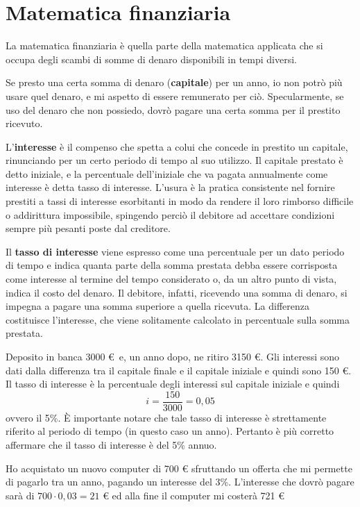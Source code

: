 
\chapter{Matematica finanziaria}

La matematica finanziaria è quella parte della matematica applicata che si 
occupa degli scambi di somme di denaro disponibili in tempi diversi.

Se presto una certa somma di denaro (\textbf{capitale}) per un anno, io non 
potrò più usare quel denaro, e mi aspetto di essere remunerato per ciò. 
Specularmente, se uso del denaro che non possiedo, dovrò pagare una certa somma 
per il prestito ricevuto. 

L'\textbf{interesse} è il compenso che spetta a colui che concede in prestito 
un capitale, rinunciando per un certo periodo di tempo al suo utilizzo. Il 
capitale prestato è detto iniziale, e la percentuale dell'iniziale che va 
pagata annualmente come interesse è detta tasso di interesse. L'usura è la 
pratica consistente nel fornire prestiti a tassi di interesse esorbitanti in 
modo da rendere il loro rimborso difficile o addirittura impossibile, spingendo 
perciò il debitore ad accettare condizioni sempre più pesanti poste dal 
creditore.

Il \textbf{tasso di interesse} viene espresso come una percentuale per un dato 
periodo di tempo e indica quanta parte della somma prestata debba essere 
corrisposta come interesse al termine del tempo considerato o, da un altro 
punto di vista, indica il costo del denaro. Il debitore, infatti, ricevendo una 
somma di denaro, si impegna a pagare una somma superiore a quella ricevuta. La 
differenza costituisce l'interesse, che viene solitamente calcolato in 
percentuale sulla somma prestata.

\begin{exrig}
\begin{esempio}
Deposito in banca 3000 € \,e, un anno dopo, ne ritiro 3150 €. Gli interessi sono 
dati dalla differenza tra il capitale finale e il capitale iniziale e quindi 
sono 150 €. Il tasso di interesse è la percentuale degli interessi sul capitale 
iniziale e quindi
$$ i = \dfrac{150}{3000} = 0,05 $$
ovvero il 5\%. \`{E} importante notare che tale tasso di interesse è 
strettamente riferito al periodo di tempo (in questo caso un anno). Pertanto è 
più corretto affermare che il tasso di interesse è del 5\% annuo. 
\end{esempio}

\begin{esempio}
Ho acquistato un nuovo computer di 700 € sfruttando un offerta che mi permette 
di pagarlo tra un anno, pagando un interesse del 3\%.
L'interesse che dovrò pagare sarà di $700 \cdot 0,03 = 21$ € ed alla fine il 
computer mi costerà 721 €
\end{esempio}

\end{exrig}

